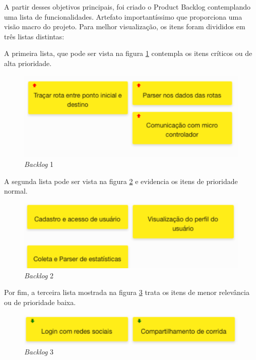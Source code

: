 A partir desses objetivos principais, foi criado o Product Backlog contemplando uma lista de funcionalidades. Artefato importantíssimo que proporciona uma visão macro do projeto. Para melhor visualização, os itens foram divididos em três listas distintas:

A primeira lista, que pode ser vista na figura \ref{img:figura1} contempla os itens críticos ou de alta prioridade.

\graphicspath{{figuras/}}
\begin{figure}[h!]
\centering
\includegraphics[scale=0.80]{figura1}
\caption{\textit{Backlog} 1}
\label{img:figura1}
\end{figure}

A segunda lista pode ser vista na figura \ref{img:figura2} e evidencia os itens de prioridade normal.

\graphicspath{{figuras/}}
\begin{figure}[h!]
\centering
\includegraphics[scale=0.80]{figura2}
\caption{\textit{Backlog} 2}
\label{img:figura2}
\end{figure}

Por fim, a terceira lista mostrada na figura \ref{img:figura3} trata os itens de menor relevância ou de prioridade baixa.

\graphicspath{{figuras/}}
\begin{figure}[h!]
\centering
\includegraphics[scale=0.80]{figura3}
\caption{\textit{Backlog} 3}
\label{img:figura3}
\end{figure}

